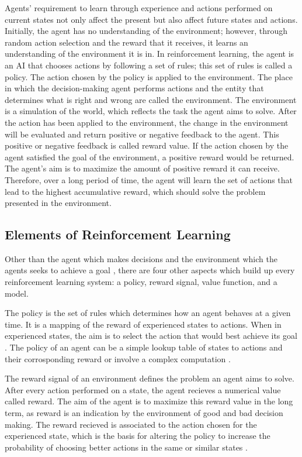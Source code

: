 Agents' requirement to learn through experience and actions performed on current states not only affect the present but also affect future states and actions. Initially, the agent has no understanding of the environment; however, through random action selection and the reward that it receives, it learns an understanding of the environment it is in. In reinforcement learning, the agent is an AI that chooses actions by following a set of rules; this set of rules is called a policy. The action chosen by the policy is applied to the environment. The place in which the decision-making agent performs actions and the entity that determines what is right and wrong are called the environment. The environment is a simulation of the world, which reflects the task the agent aims to solve. After the action has been applied to the environment, the change in the environment will be evaluated and return positive or negative feedback to the agent. This positive or negative feedback is called reward value. If the action chosen by the agent satisfied the goal of the environment, a positive reward would be returned. The agent’s aim is to maximize the amount of positive reward it can receive. Therefore, over a long period of time, the agent will learn the set of actions that lead to the highest accumulative reward, which should solve the problem presented in the environment. 

\subsection{Elements of Reinforcement Learning}

Other than the agent which makes decisions and the environment which the agents seeks to achieve a goal \cite{Sutton1}, there are four other aspects which build up every reinforcement learning system: a policy, reward signal, value function, and a model.

The policy is the set of rules which determines how an agent behaves at a given time. It is a mapping of the reward of experienced states to actions. When in experienced states, the aim is to select the action that would best achieve its goal \cite{GabrieleDe}. The policy of an agent can be a simple lookup table of states to actions and their corrosponding reward or involve a complex computation \cite{Sutton1}. 

The reward signal of an environment defines the problem an agent aims to solve. After every action performed on a state, the agent recieves a numerical value called reward. The aim of the agent is to maximize this reward value in the long term, as reward is an indication by the environment of good and bad decision making. The reward recieved is associated to the action chosen for the experienced state, which is the basis for altering the policy to increase the probability of choosing better actions in the same or similar states \cite{Sutton1}. 


